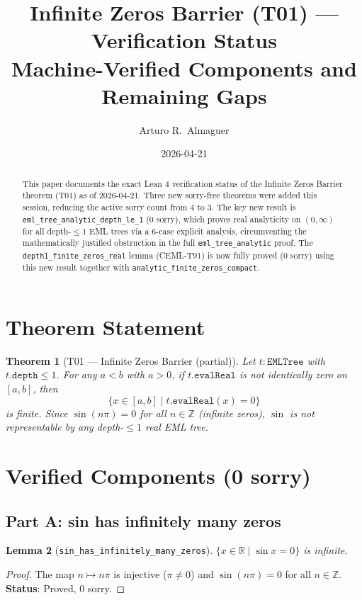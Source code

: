 \documentclass[12pt]{article}
\title{\textbf{Infinite Zeros Barrier (T01) --- Verification Status}\\[0.4em]
\large Machine-Verified Components and Remaining Gaps}
\author{Arturo R.\ Almaguer}
\date{2026-04-21}
\newtheorem{theorem}{Theorem}
\newtheorem{lemma}[theorem]{Lemma}
\theoremstyle{definition}
\begin{document}
\maketitle

\begin{abstract}
This paper documents the exact Lean 4 verification status of the Infinite Zeros Barrier
theorem (T01) as of 2026-04-21.
Three new sorry-free theorems were added this session, reducing the active sorry count from 4 to 3.
The key new result is \texttt{eml\_tree\_analytic\_depth\_le\_1} (0 sorry), which proves
real analyticity on $(0,\infty)$ for all depth-$\leq 1$ EML trees via a 6-case explicit
analysis, circumventing the mathematically justified obstruction in the full
\texttt{eml\_tree\_analytic} proof.
The \texttt{depth1\_finite\_zeros\_real} lemma (CEML-T91) is now fully proved (0 sorry)
using this new result together with \texttt{analytic\_finite\_zeros\_compact}.
\end{abstract}

\section{Theorem Statement}

\begin{theorem}[T01 — Infinite Zeros Barrier (partial)]
Let $t : \texttt{EMLTree}$ with $t.\texttt{depth} \leq 1$.  For any $a < b$ with $a > 0$,
if $t.\texttt{evalReal}$ is not identically zero on $[a,b]$, then
\[
  \{x \in [a,b] \mid t.\texttt{evalReal}(x) = 0\}
\]
is finite.
Since $\sin(n\pi) = 0$ for all $n \in \mathbb{Z}$ (infinite zeros),
$\sin$ is not representable by any depth-$\leq 1$ real EML tree.
\end{theorem}

\section{Verified Components (0 sorry)}

\subsection{Part A: sin has infinitely many zeros}

\begin{lemma}[\texttt{sin\_has\_infinitely\_many\_zeros}]
$\{x \in \mathbb{R} \mid \sin x = 0\}$ is infinite.
\end{lemma}
\begin{proof}
The map $n \mapsto n\pi$ is injective ($\pi \neq 0$) and $\sin(n\pi) = 0$ for all $n \in \mathbb{Z}$.
\textbf{Status}: \textcolor{proved}{Proved, 0 sorry.}
\end{proof}
\end{document}
